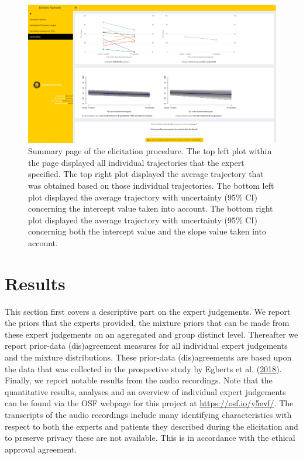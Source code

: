 \documentclass[openright,titlepage,12pt,a4paper]{book}
\begin{document}
\begin{figure}[H]

{\centering \includegraphics[width=0.9\linewidth]{figures/chapter_6/Figure5} 

}

\caption{Summary page of the elicitation procedure. The top left plot within the page displayed all individual trajectories that the expert specified. The top right plot displayed the average trajectory that was obtained based on those individual trajectories. The bottom left plot displayed the average trajectory with uncertainty (95\% CI) concerning the intercept value taken into account. The bottom right plot displayed the average trajectory with uncertainty (95\% CI) concerning both the intercept value and the slope value taken into account.}\label{fig:ch06fig5}
\end{figure}

\hypertarget{results-4}{%
\section{Results}\label{results-4}}

This section first covers a descriptive part on the expert judgements. We report the priors that the experts provided, the mixture priors that can be made from these expert judgements on an aggregated and group distinct level. Thereafter we report prior-data (dis)agreement measures for all individual expert judgements and the mixture distributions. These prior-data (dis)agreements are based upon the data that was collected in the prospective study by Egberts et al. (\protect\hyperlink{ref-egberts_mother_2018}{2018}). Finally, we report notable results from the audio recordings. Note that the quantitative results, analyses and an overview of individual expert judgements can be found via the OSF webpage for this project at \url{https://osf.io/y5evf/}. The transcripts of the audio recordings include many identifying characteristics with respect to both the experts and patients they described during the elicitation and to preserve privacy these are not available. This is in accordance with the ethical approval agreement.
\end{document}
